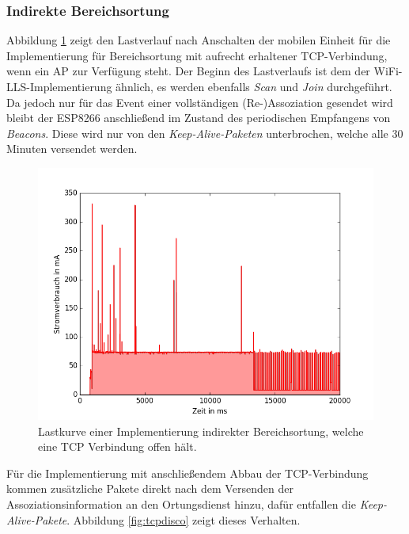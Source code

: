 \subsubsection{Indirekte Bereichsortung}
\label{ch:phase1:sec:powerindirekt}
Abbildung \ref{fig:tcphold} zeigt den Lastverlauf nach Anschalten der mobilen Einheit für die Implementierung für Bereichsortung mit aufrecht erhaltener TCP-Verbindung, wenn ein AP zur Verfügung steht. 
Der Beginn des Lastverlaufs ist dem der WiFi-LLS-Implementierung ähnlich, es werden ebenfalls \emph{Scan} und \emph{Join} durchgeführt.
Da jedoch nur für das Event einer vollständigen (Re-)Assoziation gesendet wird bleibt der ESP8266 anschließend im Zustand des periodischen Empfangens von \emph{Beacons}.
Diese wird nur von den \emph{Keep-Alive-Paketen} unterbrochen, welche alle 30 Minuten versendet werden.\\

\begin{figure}[h!]
  \centering
	\includegraphics[width=\textwidth]{plots/tcphold.png}
  \caption{Lastkurve einer Implementierung indirekter Bereichsortung, welche eine TCP Verbindung offen hält.}
  \label{fig:tcphold}
\end{figure}

Für die Implementierung mit anschließendem Abbau der TCP-Verbindung kommen zusätzliche Pakete direkt nach dem Versenden der Assoziationsinformation an den Ortungsdienst hinzu, dafür entfallen die \emph{Keep-Alive-Pakete}.
Abbildung \ref{fig:tcpdisco} zeigt dieses Verhalten.\\

